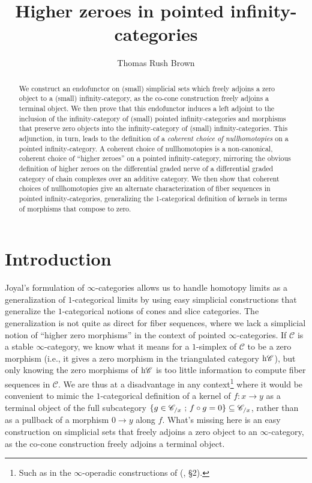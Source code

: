 \documentclass{tac}
\title{Higher zeroes in pointed infinity-categories}
\author{Thomas Rush Brown}
\date{\vspace{-5ex}} %
\newcommand{\s}[1]{\mathscr{#1}}
\newcommand{\tx}[1]{\textnormal{#1}}
\begin{document}
\maketitle
 \begin{abstract} We construct an endofunctor on (small) simplicial sets which freely adjoins a zero object to a (small) infinity-category, as the co-cone construction freely adjoins a terminal object.  We then prove that this endofunctor induces a left adjoint to the inclusion of the infinity-category of (small) pointed infinity-categories and morphisms that preserve zero objects into the infinity-category of (small) infinity-categories.  This adjunction, in turn, leads to the definition of a \emph{coherent choice of nullhomotopies} on a pointed infinity-category.  A coherent choice of nullhomotopies is a non-canonical, coherent choice of ``higher zeroes'' on a pointed infinity-category, mirroring the obvious definition of higher zeroes on the differential graded nerve of a differential graded category of chain complexes over an additive category.  We then show that coherent choices of nullhomotopies give an alternate characterization of fiber sequences in pointed infinity-categories, generalizing the 1-categorical definition of kernels in terms of morphisms that compose to zero.
  \end{abstract}
\section{Introduction}
Joyal's formulation of $\infty$-categories allows us to handle homotopy limits as a generalization of $1$-categorical limits by using easy simplicial constructions that generalize the $1$-categorical notions of cones and slice categories.  The generalization is not quite as direct for fiber sequences, where we lack a simplicial notion of ``higher zero morphisms'' in the context of pointed $\infty$-categories.  If $\s{C}$ is a stable $\infty$-category, we know what it means for a $1$-simplex of $\s{C}$ to be a zero morphism (i.e., it gives a zero morphism in the triangulated category $\tx{h}\s{C}$), but only knowing the zero morphisms of $\tx{h}\s{C}$ is too little information to compute fiber sequences in $\s{C}$.  We are thus at a disadvantage in any context\footnote{Such as in the $\infty$-operadic constructions of (\cite{thesis}, \S 2).} where it would be convenient to mimic the $1$-categorical definition of a kernel of $f: x\to y$ as a terminal object of the full subcategory $\{ g\in \s{C}_{/x}\tx{ ; } f\circ g=0 \} \subseteq \s{C}_{/x}$, rather than as a pullback of a morphism $0\to y$ along $f$.  What's missing here is an easy construction on simplicial sets that freely adjoins a zero object to an $\infty$-category, as the co-cone construction freely adjoins a terminal object.
\end{document}
